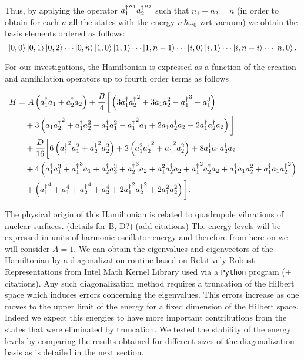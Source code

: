 \documentclass[../thesis.tex]{subfiles}
\begin{document}
Thus, by applying the operator \({a_{1}^{\dagger}}^{n_1} {a_{2}^{\dagger}}^{n_2}\)
such that \(n_1 + n_2 = n\) (in order to obtain for each \(n\) all the states with the
energy \(n\, \hbar \omega_0\) {\color{red} wrt vacuum}) we obtain the basis elements ordered as follows:
\[
  \ket{0, 0} \ket{0, 1} \ket{0, 2} \cdots \ket{0, n} \ket{1, 0} \ket{1, 1}
  \cdots \ket{1, n - 1} \cdots \ket{i, 0} \ket{i, 1} \cdots \ket{i, n - i} \cdots
  \ket{n, 0}.
\]

For our investigations, the Hamiltonian is expressed as a function of the creation and annihilation
operators up to fourth order terms as follows

\begin{equation}
\label{eq:hamilt}
\begin{split}
  H &= A \left( a_{1}^{\dagger} a_1 + a_{2}^{\dagger} a_2 \right)
    + \frac{B}{4} \bigg[ \left( 3 a_{1}^{\dagger} {a_{2}^{\dagger}}^2 + 3 a_1 a_2^2
                               - {a_{1}^{\dagger}}^3 - a_1^3 \right)   \\
  &\quad + 3 \left( a_1 {a_{2}^{\dagger}}^2 + a_{1}^{\dagger} a_2^2 - a_{1}^{\dagger} a_1^2 - {a_{1}^{\dagger}}^2 a_1
             + 2 a_1 a_{2}^{\dagger} a_2 + 2 a_{1}^{\dagger} a_{2}^{\dagger} a_2
          \right) \bigg]  \\
  &\quad + \frac{D}{16} \bigg[ 6 \left( {a_{1}^{\dagger}}^2 a_1^2 + {a_{2}^{\dagger}}^2 a_2^2 \right)
                        + 2 \left( a_1^2 {a_{2}^{\dagger}}^2 + {a_{1}^{\dagger}}^2 a_2^2 \right)
                        + 8 a_{1}^{\dagger} a_1 a_{2}^{\dagger} a_2  \\
  &\quad + 4 \left(a_{1}^{\dagger} a_1^3 + {a_{1}^{\dagger}}^3 a_1 + a_{2}^{\dagger} a_2^3 + {a_{2}^{\dagger}}^3 a_2
     + a_1^2 a_{2}^{\dagger} a_2 + {a_{1}^{\dagger}}^2 a_{2}^{\dagger} a_2 + a_{1}^{\dagger} a_1 a_2^2 + a_{1}^{\dagger} a_1 {a_{2}^{\dagger}}^2
        \right)  \\
  &\quad + \left( {a_{1}^{\dagger}}^4 + a_1^4 + {a_{2}^{\dagger}}^4 + a_2^4
     + 2 {a_{1}^{\dagger}}^2 {a_{2}^{\dagger}}^2 + 2 a_1^2 a_2^2
      \right)
                        \bigg].
\end{split}
\end{equation}

The physical origin of this Hamiltonian is related to quadrupole vibrations of
nuclear surfaces. {\color{red} (details for B, D?) (add citations)}
The energy levels will be expressed in units of harmonic oscillator energy and therefore
from here on we will consider \(A = 1\).
We can obtain the eigenvalues and eigenvectors of the Hamiltonian by a
diagonalization routine based on Relatively Robust Representations from
Intel\textsuperscript{\textregistered} Math Kernel Library used via a \texttt{Python}
program{\color{red} (+ citations)}.
Any such diagonalization method requires a truncation of the Hilbert space
which induces errors concerning the eigenvalues. This errors increase as one moves to
the upper limit of the energy for a fixed dimension of the Hilbert space. Indeed we
expect this energies to have more important contributions from the states that were
eliminated by truncation.
We tested the stability of the energy levels by comparing the results obtained for
different sizes of the diagonalization basis as is detailed in the next section.
\end{document}
